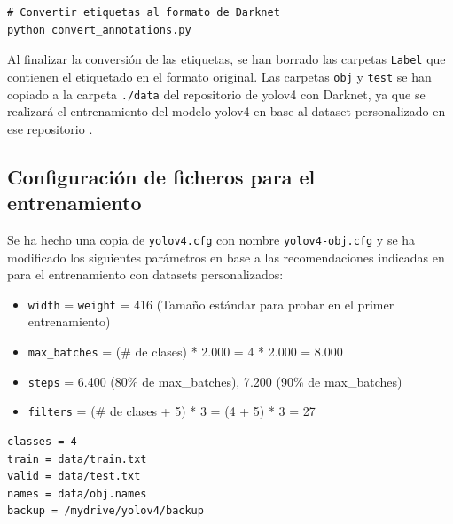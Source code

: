 \vspace{0.5cm}
\begin{lstlisting}[language=iPython,caption=Descarga dataset Open Images Dataset v4 (3),captionpos=b,label={lst:download-oidv4_3}]
# Convertir etiquetas al formato de Darknet
python convert_annotations.py
\end{lstlisting}

Al finalizar la conversión de las etiquetas, se han borrado las carpetas \texttt{Label} que contienen el etiquetado en el formato original. Las carpetas \texttt{obj} y \texttt{test} se han copiado a la carpeta \texttt{./data} del repositorio de \gls{yolov4} con Darknet, ya que se realizará el entrenamiento del modelo \gls{yolov4} en base al dataset personalizado en ese repositorio \cite{yolov4-darknet-github}.

\subsection{Configuración de ficheros para el entrenamiento}
\label{subsec:configuracion-ficheros-training}


Se ha hecho una copia de \texttt{yolov4.cfg} con nombre \texttt{yolov4-obj.cfg} y se ha modificado los siguientes parámetros en base a las recomendaciones indicadas en \cite{yolov4-darknet-github} para el entrenamiento con datasets personalizados:

\begin{itemize}
    \item \texttt{width} = \texttt{weight} = 416 (Tamaño estándar para probar en el primer entrenamiento)
    \item \texttt{max\_batches} = (\# de clases) * 2.000 = 4 * 2.000 = 8.000
    \item \texttt{steps} = 6.400 (80\% de max\_batches), 7.200 (90\% de max\_batches)
    \item \texttt{filters} = (\# de clases + 5) * 3 = (4 + 5) * 3 = 27
\end{itemize}

\vspace{0.5cm}
\begin{lstlisting}[language=iPython,caption=Fichero obj.data,captionpos=b,label={lst:obj-data-file}]
classes = 4
train = data/train.txt
valid = data/test.txt
names = data/obj.names
backup = /mydrive/yolov4/backup
\end{lstlisting}

